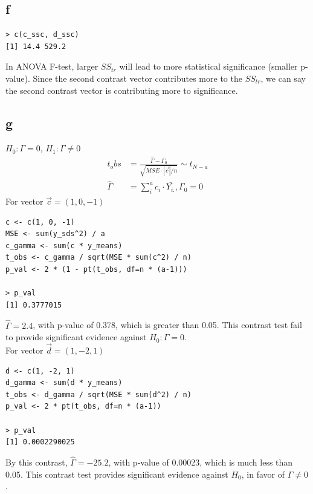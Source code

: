 \documentclass[11pt,letterpaper]{article}
\let\hat\widehat
\begin{document}
\subsection*{f}
\begin{verbatim}
> c(c_ssc, d_ssc)
[1] 14.4 529.2
\end{verbatim}
\noindent In ANOVA F-test, larger $SS_{tr}$ will lead to more statistical significance (smaller p-value). Since the second contrast vector contributes more to the $SS_{tr}$, we can say the second contrast vector is contributing more to significance. 

\subsection*{g}
\noindent $H_0: \Gamma = 0$, $H_1: \Gamma \neq 0$
\begin{align*}
t_obs &= \frac{\hat{\Gamma} - \Gamma_0}{\sqrt{MSE \cdot |\vec{c}| / n  }} \sim t_{N-a} \\
\hat{\Gamma} &= \sum_i^a c_i \cdot \bar{Y_{i.}}, \Gamma_0 = 0
\end{align*}
\noindent For vector $\vec{c} = (1, 0, -1)$
\begin{verbatim}
c <- c(1, 0, -1)
MSE <- sum(y_sds^2) / a
c_gamma <- sum(c * y_means)
t_obs <- c_gamma / sqrt(MSE * sum(c^2) / n)
p_val <- 2 * (1 - pt(t_obs, df=n * (a-1)))

> p_val
[1] 0.3777015
\end{verbatim}
\noindent $\hat{\Gamma} = 2.4$, with p-value of 0.378, which is greater than 0.05. This contrast test fail to provide significant evidence against $H_0: \Gamma = 0$. \\

\noindent For vector $\vec{d} = (1, -2, 1)$
\begin{verbatim}
d <- c(1, -2, 1)
d_gamma <- sum(d * y_means)
t_obs <- d_gamma / sqrt(MSE * sum(d^2) / n)
p_val <- 2 * pt(t_obs, df=n * (a-1))

> p_val
[1] 0.0002290025
\end{verbatim}
\noindent By this contrast, $\hat{\Gamma} = -25.2$, with p-value of 0.00023, which is much less than 0.05. This contrast test provides significant evidence against $H_0$, in favor of $\Gamma \neq 0$.
\end{document}
